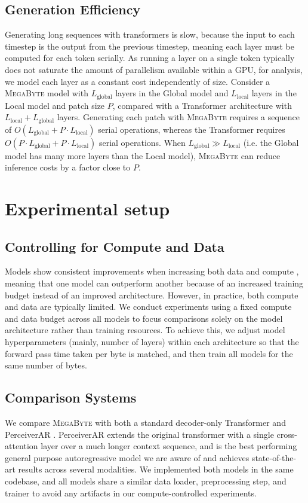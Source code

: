 \subsection{Generation Efficiency} Generating long sequences with transformers is slow, because the input to each timestep is the output from the previous timestep, meaning each layer must be computed for each token serially. As running a layer on a single token typically does not saturate the amount of parallelism available within a GPU, for analysis, we model each layer as a constant cost independently of size. Consider a \textsc{MegaByte} model with $L_{\text{global}}$ layers in the Global model and $L_{\text{local}}$ layers in the Local model and patch size $P$, compared with a Transformer architecture with $L_{\text{local}}+L_{\text{global}}$ layers. Generating each patch with \textsc{MegaByte} requires a sequence of $O(L_{\text{global}}+P\cdot L_{\text{local}})$ serial operations, whereas the Transformer requires $O(P\cdot L_{\text{global}}+P\cdot L_{\text{local}})$ serial operations. When $L_{\text{global}}\gg L_{\text{local}}$ (i.e. the Global model has many more layers than the Local model), \textsc{MegaByte} can reduce inference costs by a factor close to $P$.

\section{Experimental setup}
\label{sec:exp}

\subsection{Controlling for Compute and Data}
    \label{sec:controlled_exp}
Models show consistent improvements when increasing both data and compute \cite{kaplan2020scaling,Chinchilla}, meaning that one model can outperform another because of an increased training budget instead of an improved architecture. However, in practice, both compute and data are typically limited. We conduct experiments using a fixed compute and data budget across all models to focus comparisons solely on the model architecture rather than training resources. To achieve this, we adjust model hyperparameters (mainly, number of layers) within each architecture so that the forward pass time taken per byte is matched, and then train all models for the same number of bytes.

\subsection{Comparison Systems} We compare \textsc{MegaByte} with both a standard decoder-only Transformer and PerceiverAR \citep{perceiverar}. PerceiverAR extends the original transformer with a single cross-attention layer over a much longer context sequence, and is the best performing general purpose autoregressive model we are aware of and achieves state-of-the-art results across several modalities. We implemented both models in the same codebase, and all models share a similar data loader, preprocessing step, and trainer to avoid any artifacts in our compute-controlled experiments.

